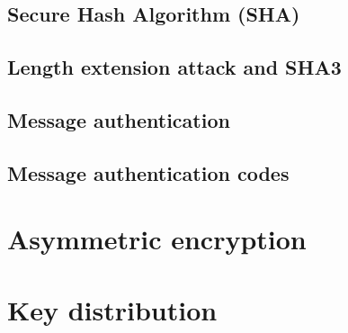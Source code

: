 \documentclass[12pt]{article}
\begin{document}
 
 \subsection{Secure Hash Algorithm (SHA)}
 \subsection{Length extension attack and SHA3}
 \subsection{Message authentication}
 \subsection{Message authentication codes}
 
 \section{Asymmetric encryption}
 
 \section{Key distribution}
  
\end{document}
